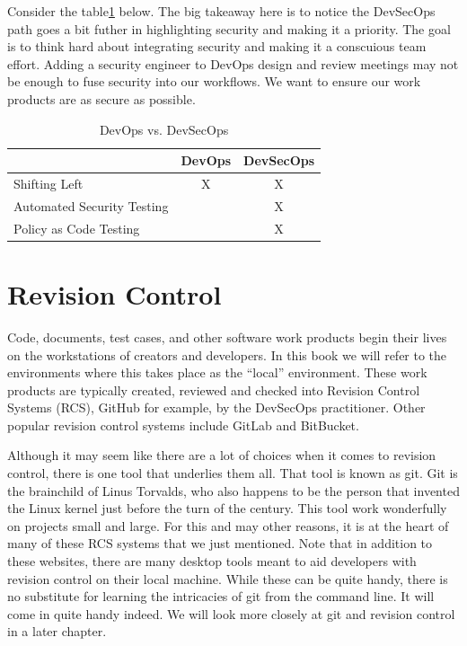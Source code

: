 \justify{}
Consider the table\ref{DevOps vs. DevSecOps} below. The big takeaway here is to notice the 
DevSecOps path goes a bit futher
in highlighting security and making it a priority. The goal is to think hard about integrating
security and making it a conscuious team effort. Adding a security engineer to DevOps design 
and review meetings may not be enough to fuse security into our workflows. We want to ensure
our work products are as secure as possible.

\begin{table}[ht]
    \centering
    \begin{tabular}{|l|c|c|}\hline
                                   & DevOps & DevSecOps \\\hline
        Shifting Left              &   X    &    X       \\\hline
        Automated Security Testing &        &    X       \\\hline
        Policy as Code Testing     &        &    X       \\\hline

    \end{tabular}
\caption{DevOps vs. DevSecOps}
\label{DevOps vs. DevSecOps}
\end{table}

\section{Revision Control}

\justify{}
Code, documents, test cases, and other software work products begin their lives on the workstations of creators
and developers. In this book we will refer to the environments where this takes place as the ``local'' environment.
These work products are typically created, reviewed and checked into Revision Control Systems 
(RCS), GitHub for example, by the DevSecOps practitioner. 
Other popular revision control systems include GitLab and BitBucket.

\justify{}
Although it may seem like there are a lot of choices when it comes to revision control, there
is one tool that
underlies them all. That tool is known as git. Git is the brainchild of Linus Torvalds, who also
happens to be
the person that invented the Linux kernel just before the turn of the century. This tool work wonderfully
on projects small
and large. For this and may other reasons, it is at the heart of many of these RCS systems that we just mentioned. Note that
in addition to these websites, there are many desktop tools meant to aid developers with revision control on their local
machine. While these can be quite handy, there is no substitute for learning the intricacies of git from the command
line. It will come in quite handy indeed.
\justify{}
We will look more closely at git and revision control in a later chapter.

